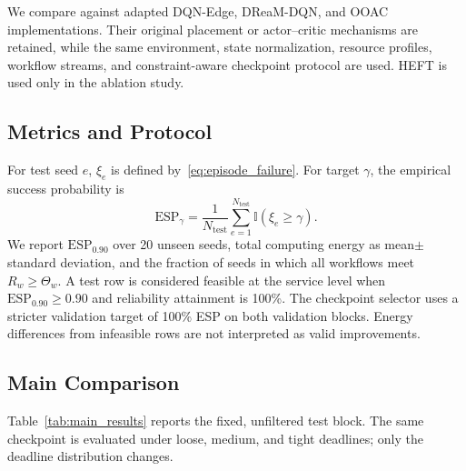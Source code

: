 \documentclass[lettersize,journal]{IEEEtran}
\newcommand{\ind}{\mathbb{I}}
\begin{document}
We compare against adapted DQN-Edge, DReaM-DQN, and OOAC implementations. Their
original placement or actor--critic mechanisms are retained, while the same
environment, state normalization, resource profiles, workflow streams, and
constraint-aware checkpoint protocol are used. HEFT is used only in the
ablation study.

\subsection{Metrics and Protocol}
For test seed $e$, $\xi_e$ is defined by~\eqref{eq:episode_failure}. For target
$\gamma$, the empirical success probability is
\begin{equation}
 \mathrm{ESP}_{\gamma}=\frac{1}{N_{\mathrm{test}}}
 \sum_{e=1}^{N_{\mathrm{test}}}\ind(\xi_e\ge\gamma).
 \label{eq:esp}
\end{equation}
We report $\mathrm{ESP}_{0.90}$ over 20 unseen seeds, total computing energy as
mean$\pm$standard deviation, and the fraction of seeds in which all workflows
meet $R_w\ge\Theta_w$. A test row is considered feasible at the service level
when $\mathrm{ESP}_{0.90}\ge0.90$ and reliability attainment is 100\%. The
checkpoint selector uses a stricter validation target of 100\% ESP on both
validation blocks. Energy differences from infeasible rows are not interpreted
as valid improvements.

\subsection{Main Comparison}
Table~\ref{tab:main_results} reports the fixed, unfiltered test block. The same
checkpoint is evaluated under loose, medium, and tight deadlines; only the
deadline distribution changes.
\end{document}
